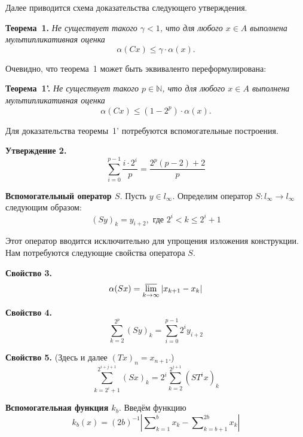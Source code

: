 \documentclass[a5paper,12pt,openbib]{report}
\begin{document}
Далее приводится схема доказательства следующего утверждения.


\textbf{Теорема~1.}
{\it
	Не существует такого $\gamma < 1$,
	что для любого $x\in A$ выполнена мультипликативная оценка
	$$
		\alpha(Cx) \leqslant \gamma \cdot \alpha(x).
	$$
}

Очевидно, что теорема~1 может быть эквиваленто переформулирована:

\textbf{Теорема~1'.}
{\it
	Не существует такого $p\in \mathbb{N}$,
	что для любого $x\in A$ выполнена мультипликативная оценка
	$$
		\alpha(Cx) \leqslant (1-2^p)\cdot \alpha(x).
	$$
}

Для доказательства теоремы~1' потребуются вспомогательные построения.


\textbf{Утверждение 2.}
\begin{equation}\label{summa_drobey}
	\sum_{i=0}^{p-1} \frac{i \cdot 2^i}{p} = \frac{2^p(p-2) + 2}{p}
\end{equation}


\textbf{Вспомогательный оператор $S$}.
Пусть $y\in l_\infty$.
Определим оператор $S:l_\infty \to l_\infty$ следующим образом:
\begin{equation}\label{operator_S}
	(Sy)_k = y_{i+2}, \mbox{ где } 2^i < k \leq 2^i+1
\end{equation}

Этот оператор вводится исключительно для упрощения изложения конструкции.
Нам потребуются следующие свойства оператора $S$.

\textbf{Свойство 3.}
\begin{equation}\label{alpha_S}
	\alpha(Sx) = \varlimsup_{k\to\infty} |x_{k+1} - x_{k}|
\end{equation}

\textbf{Свойство 4.}
\begin{equation}\label{summa_S_less}
	\sum_{k=2}^{2^p} (Sy)_k =
	\sum_{i=0}^{p-1} 2^i y_{i+2}
\end{equation}


\textbf{Свойство 5.} (Здесь и далее $(Tx)_n = x_{n+1}$.)
\begin{equation}\label{summa_S}
	\sum_{k=2^i+1}^{2^{i+j+1}} (Sx)_k =
	2^i\sum_{k=2}^{2^{j+1}} (ST^ix)_k
\end{equation}

\textbf{Вспомогательная функция $k_b$}.
Введём функцию
\begin{equation}\label{def_k_b}
	k_b(x) = (2b)^{-1} \left|
		\sum\nolimits_{k=1}^{b}x_k - \sum\nolimits_{k=b+1}^{2b}x_k
	\right|
\end{equation}
\end{document}
